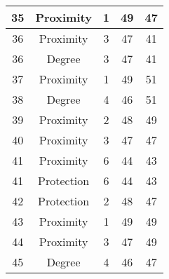 \documentclass[results.tex]{subfiles}
\begin{document}
\begin{center}
\begin{tabular}{| c || c | c | c | c |}
            \hline
            35                      & Proximity                    & 1                      & 49                      & 47                   \\
            \hline
            36                      & Proximity                    & 3                      & 47                      & 41                   \\
            \hline
            36                      & Degree                       & 3                      & 47                      & 41                   \\
            \hline
            37                      & Proximity                    & 1                      & 49                      & 51                   \\
            \hline
            38                      & Degree                       & 4                      & 46                      & 51                   \\
            \hline
            39                      & Proximity                    & 2                      & 48                      & 49                   \\
            \hline
            40                      & Proximity                    & 3                      & 47                      & 47                   \\
            \hline
            41                      & Proximity                    & 6                      & 44                      & 43                   \\
            \hline
            41                      & Protection                   & 6                      & 44                      & 43                   \\
            \hline
            42                      & Protection                   & 2                      & 48                      & 47                   \\
            \hline
            43                      & Proximity                    & 1                      & 49                      & 49                   \\
            \hline
            44                      & Proximity                    & 3                      & 47                      & 49                   \\
            \hline
            45                      & Degree                       & 4                      & 46                      & 47                   \\

\end{tabular}
\end{center}
\end{document}
